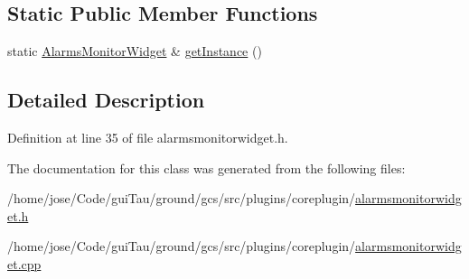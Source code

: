 \subsection*{Static Public Member Functions}
\begin{DoxyCompactItemize}
\item 
static \hyperlink{class_alarms_monitor_widget}{Alarms\-Monitor\-Widget} \& \hyperlink{group___core_plugin_ga11f85ea4e04628c4502bdb943eff5e2e}{get\-Instance} ()
\end{DoxyCompactItemize}


\subsection{Detailed Description}


Definition at line 35 of file alarmsmonitorwidget.\-h.



The documentation for this class was generated from the following files\-:\begin{DoxyCompactItemize}
\item 
/home/jose/\-Code/gui\-Tau/ground/gcs/src/plugins/coreplugin/\hyperlink{alarmsmonitorwidget_8h}{alarmsmonitorwidget.\-h}\item 
/home/jose/\-Code/gui\-Tau/ground/gcs/src/plugins/coreplugin/\hyperlink{alarmsmonitorwidget_8cpp}{alarmsmonitorwidget.\-cpp}\end{DoxyCompactItemize}
